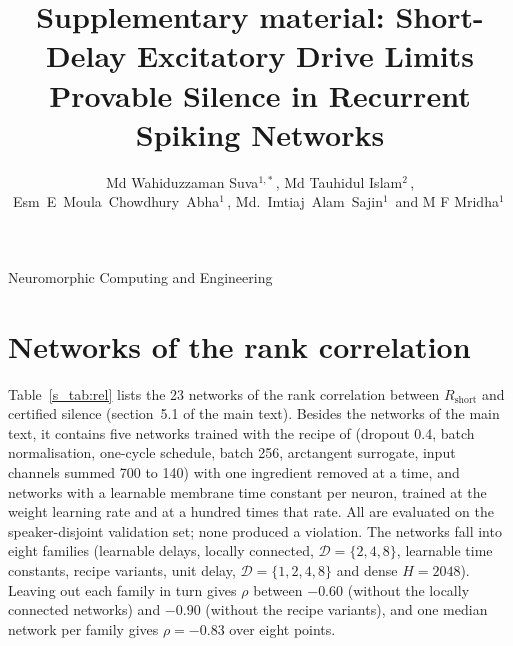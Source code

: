 \documentclass{iopjournal}
\renewcommand{\articletype}[1]{{\vspace*{-8mm}\noindent \Large \sf Neuromorphic Computing and Engineering}\par
\vspace*{8mm}\noindent{\scriptsize \sf{\bfseries \MakeUppercase{#1}}}}
\begin{document}
\articletype{Supplementary material}

\title{Supplementary material: Short-Delay Excitatory Drive Limits Provable Silence in Recurrent Spiking Networks}

\author{Md Wahiduzzaman Suva$^{1,*}$\,, Md Tauhidul Islam$^{2}$\,, Esm~E~Moula~Chowdhury~Abha$^{1}$\,, Md.~Imtiaj~Alam~Sajin$^{1}$\, and M F Mridha$^{1}$\,}

\section{Networks of the rank correlation}

Table~\ref{s_tab:rel} lists the 23 networks of the rank correlation between $R_{\mathrm{short}}$ and certified silence (section~5.1 of the main text). Besides the networks of the main text, it contains five networks trained with the recipe of \cite{s_dcls} (dropout 0.4, batch normalisation, one-cycle schedule, batch 256, arctangent surrogate, input channels summed 700 to 140) with one ingredient removed at a time, and networks with a learnable membrane time constant per neuron, trained at the weight learning rate and at a hundred times that rate. All are evaluated on the speaker-disjoint validation set; none produced a violation. The networks fall into eight families (learnable delays, locally connected, $\mathcal{D}=\{2,4,8\}$, learnable time constants, recipe variants, unit delay, $\mathcal{D}=\{1,2,4,8\}$ and dense $H=2048$). Leaving out each family in turn gives $\rho$ between $-0.60$ (without the locally connected networks) and $-0.90$ (without the recipe variants), and one median network per family gives $\rho=-0.83$ over eight points.
\end{document}
